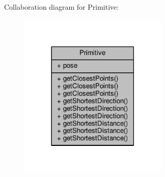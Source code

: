 Collaboration diagram for Primitive\+:\nopagebreak
\begin{figure}[H]
\begin{center}
\leavevmode
\includegraphics[width=201pt]{class_primitive__coll__graph}
\end{center}
\end{figure}
